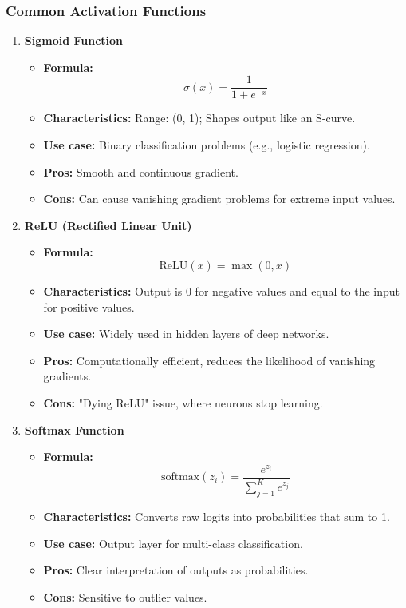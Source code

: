 \documentclass[aspectratio=169]{beamer}
\begin{document}
\begin{frame}[fragile]
    \frametitle{Common Activation Functions}
    \begin{enumerate}
        \item \textbf{Sigmoid Function}
        \begin{itemize}
            \item \textbf{Formula:} 
            \[
            \sigma(x) = \frac{1}{1 + e^{-x}}
            \]
            \item \textbf{Characteristics:} Range: (0, 1); Shapes output like an S-curve.
            \item \textbf{Use case:} Binary classification problems (e.g., logistic regression).
            \item \textbf{Pros:} Smooth and continuous gradient.
            \item \textbf{Cons:} Can cause vanishing gradient problems for extreme input values.
        \end{itemize}

        \item \textbf{ReLU (Rectified Linear Unit)}
        \begin{itemize}
            \item \textbf{Formula:} 
            \[
            \text{ReLU}(x) = \max(0, x)
            \]
            \item \textbf{Characteristics:} Output is 0 for negative values and equal to the input for positive values.
            \item \textbf{Use case:} Widely used in hidden layers of deep networks.
            \item \textbf{Pros:} Computationally efficient, reduces the likelihood of vanishing gradients.
            \item \textbf{Cons:} "Dying ReLU" issue, where neurons stop learning.
        \end{itemize}

        \item \textbf{Softmax Function}
        \begin{itemize}
            \item \textbf{Formula:} 
            \[
            \text{softmax}(z_i) = \frac{e^{z_i}}{\sum_{j=1}^{K} e^{z_j}}
            \]
            \item \textbf{Characteristics:} Converts raw logits into probabilities that sum to 1.
            \item \textbf{Use case:} Output layer for multi-class classification.
            \item \textbf{Pros:} Clear interpretation of outputs as probabilities.
            \item \textbf{Cons:} Sensitive to outlier values.
        \end{itemize}
    \end{enumerate}
\end{frame}
\end{document}
